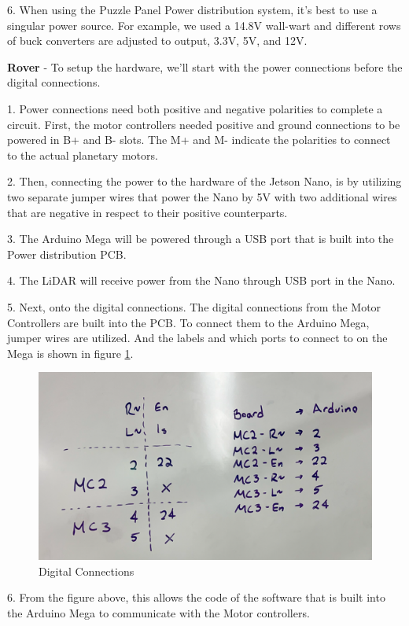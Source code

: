 \documentclass[a4paper, 10pt]{article}
\begin{document}
6. When using the Puzzle Panel Power distribution system, it's best to use a singular power source. For example, we used a 14.8V wall-wart and different rows of buck converters are adjusted to output, 3.3V, 5V, and 12V.

\textbf{Rover} - To setup the hardware, we'll start with the power connections before the digital connections.

1. Power connections need both positive and negative polarities to complete a circuit. First, the motor controllers needed positive and ground connections to be powered in B+ and B- slots. The M+ and M- indicate the polarities to connect to the actual planetary motors. 

2. Then, connecting the power to the hardware of the Jetson Nano, is by utilizing two separate jumper wires that power the Nano by 5V with two additional wires that are negative in respect to their positive counterparts.  

3. The Arduino Mega will be powered through a USB port that is built into the Power distribution PCB.

4. The LiDAR will receive power from the Nano through USB port in the Nano.

5. Next, onto the digital connections. The digital connections from the Motor Controllers are built into the PCB. To connect them to the Arduino Mega, jumper wires are utilized. And the labels and which ports to connect to on the Mega is shown in figure \ref{dig_con}.

	\begin{figure} [!h]
			\centering
			\includegraphics[scale=0.5]{Photos/Digital Connections from Motor Controller to Arduino Mega}
			\caption{Digital Connections}
			\label{dig_con}
	\end{figure}

6. From the figure above, this allows the code of the software that is built into the Arduino Mega to communicate with the Motor controllers.
\end{document}
